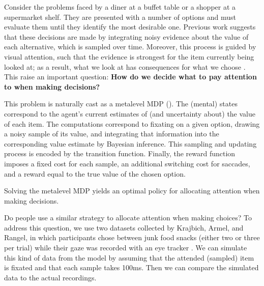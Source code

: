 \documentclass[11pt,a4paperpaper,]{article}
\begin{document}
Consider the problems faced by a diner at a buffet table or a shopper at a supermarket shelf. They are presented with a number of options and must evaluate them until they identify the most desirable one. Previous work suggests that these decisions are made by integrating noisy evidence about the value of each alternative, which is sampled over time. Moreover, this process is guided by visual attention, such that the evidence is strongest for the item currently being looked at; as a result, what we look at has consequences for what we choose \citep{krajbich2010visual}. This raise an important question: \textbf{How do we decide what to pay attention to when making
decisions?}

This problem is naturally cast as a metalevel MDP (). The (mental) states correspond to the agent's current estimates of (and uncertainty about) the value of each item. The computations correspond to fixating on a given option, drawing a noisy sample of its value, and integrating that information into the corresponding value estimate by Bayesian inference. This sampling and updating process is encoded by the transition function. Finally, the reward function imposes a fixed cost for each sample, an additional switching cost for saccades, and a reward equal to the true value of the chosen option.

Solving the metalevel MDP yields an optimal policy for allocating attention when making decisions. 



Do people use a similar strategy to allocate attention when making choices? To address this question, we use two datasets collected by Krajbich, Armel, and Rangel, in which participants chose between junk food snacks (either two or three per trial) while their gaze was recorded with an eye tracker \citep{krajbich2010visual,krajbich2011multialternative}. We can simulate this kind of data from the model by assuming that the attended (sampled) item is fixated and that each sample takes 100ms. Then we can compare the simulated data to the actual recordings.
\end{document}
